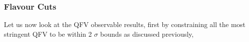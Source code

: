 \documentclass[10pt]{book}
\renewcommand{\(}{\left(}
\renewcommand{\)}{\right)}
\renewcommand{\[}{\left[}
\renewcommand{\]}{\right]}
\begin{document}

\subsubsection{Flavour Cuts }


Let us now look at the QFV observable results, first by constraining all the most stringent QFV to be within 2 $\sigma$ bounds as discussed previously,
%
%
%
\end{document}
